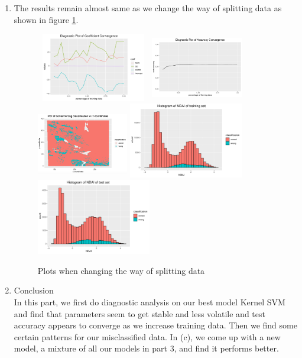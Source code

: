 \documentclass[11pt]{article}
\begin{document}
\begin{enumerate}[label=(\alph*)]
\item The results remain almost same as we change the way of splitting data as shown in figure \ref{changesplit}.

\begin{figure}[h!]
	\centering
	\includegraphics[width = 5cm,height = 3cm]{Figure/m1}
	\includegraphics[width = 4cm,height = 3cm]{Figure/m2} 
	\includegraphics[width = 4cm, height = 3cm]{Figure/coor}
	\includegraphics[width = 5cm]{Figure/hist1prime}
	\includegraphics[width = 5cm]{Figure/hist2prime}
	\caption{Plots when changing the way of splitting data}
	\label{changesplit}
\end{figure}


\item Conclusion \\
	In this part, we first do diagnostic analysis on our best model Kernel SVM and find that parameters seem to get stable and less volatile and test accuracy appears to converge as we increase training data. Then we find some certain patterns for our misclassified data. In (c), we come up with a new model, a mixture of all our models in part 3, and find it performs better.
\end{enumerate}
\end{document}
